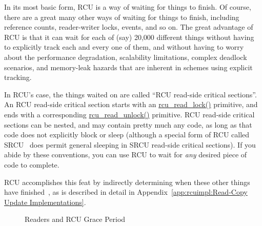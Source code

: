 In its most basic form, RCU is a way of waiting for things to finish.
Of course, there are a great many other ways of waiting for things to
finish, including reference counts, reader-writer locks, events, and so on.
The great advantage of RCU is that it can wait for each of
(say) 20,000 different things without having to explicitly
track each and every one of them, and without having to worry about
the performance degradation, scalability limitations, complex deadlock
scenarios, and memory-leak hazards that are inherent in schemes
using explicit tracking.

In RCU's case, the things waited on are called
``RCU read-side critical sections''.
An RCU read-side critical section starts with an
\url{rcu_read_lock()} primitive, and ends with a corresponding
\url{rcu_read_unlock()} primitive.
RCU read-side critical sections can be nested, and may contain pretty
much any code, as long as that code does not explicitly block or sleep
(although a special form of RCU called SRCU~\cite{PaulEMcKenney2006c}
does permit general sleeping in SRCU read-side critical sections).
If you abide by these conventions, you can use RCU to wait for \emph{any}
desired piece of code to complete.

RCU accomplishes this feat by indirectly determining when these
other things have finished~\cite{PaulEMcKenney2007whatisRCU,
PaulEMcKenney2007PreemptibleRCU}, as is described in detail in
Appendix~\ref{app:rcuimpl:Read-Copy Update Implementations}.

\begin{figure}[tb]
\begin{center}
\end{center}
\caption{Readers and RCU Grace Period}
\label{fig:defer:Readers and RCU Grace Period}
\end{figure}

